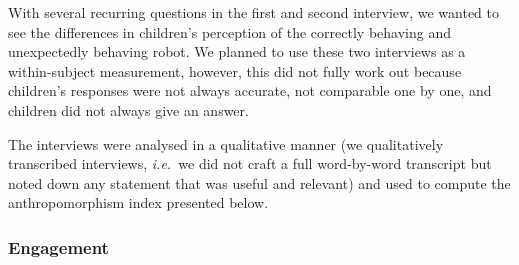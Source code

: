 \documentclass{sig-alternate}
\newcommand{\eg}{{\textit{e.g.~}}}
\newcommand{\ie}{{\textit{i.e.~}}}
\begin{document}
With several recurring questions in the first and second interview, we wanted to
see the differences in children's perception of the correctly behaving and
unexpectedly behaving robot. We planned to use these two interviews as a
within-subject measurement, however, this did not fully work out because
children's responses were not always accurate, not comparable one by one, and
children did not always give an answer.	



The interviews were analysed in a qualitative manner (we qualitatively
transcribed interviews, \ie we did not craft a full word-by-word transcript but
noted down any statement that was useful and relevant) and used to compute the
anthropomorphism index presented below.

\subsubsection{Engagement}

%
%
\end{document}
